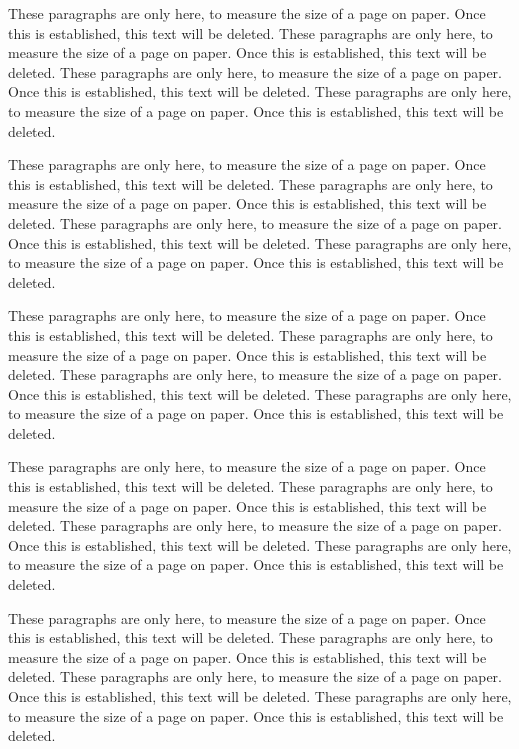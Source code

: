 These paragraphs are only here, to measure the size of a page on paper.
Once this is established, this text will be deleted.
These paragraphs are only here, to measure the size of a page on paper.
Once this is established, this text will be deleted.
These paragraphs are only here, to measure the size of a page on paper.
Once this is established, this text will be deleted.
These paragraphs are only here, to measure the size of a page on paper.
Once this is established, this text will be deleted.

These paragraphs are only here, to measure the size of a page on paper.
Once this is established, this text will be deleted.
These paragraphs are only here, to measure the size of a page on paper.
Once this is established, this text will be deleted.
These paragraphs are only here, to measure the size of a page on paper.
Once this is established, this text will be deleted.
These paragraphs are only here, to measure the size of a page on paper.
Once this is established, this text will be deleted.

These paragraphs are only here, to measure the size of a page on paper.
Once this is established, this text will be deleted.
These paragraphs are only here, to measure the size of a page on paper.
Once this is established, this text will be deleted.
These paragraphs are only here, to measure the size of a page on paper.
Once this is established, this text will be deleted.
These paragraphs are only here, to measure the size of a page on paper.
Once this is established, this text will be deleted.

These paragraphs are only here, to measure the size of a page on paper.
Once this is established, this text will be deleted.
These paragraphs are only here, to measure the size of a page on paper.
Once this is established, this text will be deleted.
These paragraphs are only here, to measure the size of a page on paper.
Once this is established, this text will be deleted.
These paragraphs are only here, to measure the size of a page on paper.
Once this is established, this text will be deleted.

These paragraphs are only here, to measure the size of a page on paper.
Once this is established, this text will be deleted.
These paragraphs are only here, to measure the size of a page on paper.
Once this is established, this text will be deleted.
These paragraphs are only here, to measure the size of a page on paper.
Once this is established, this text will be deleted.
These paragraphs are only here, to measure the size of a page on paper.
Once this is established, this text will be deleted.

